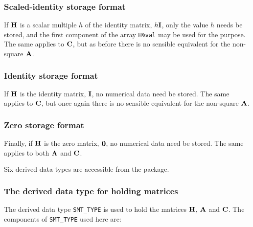 \documentclass{galahad}
\begin{document}
\subsubsection{Scaled-identity storage format}\label{scaled}
If ${\mathbf{H}}$ is a scalar multiple $h$ of the identity matrix, $h {\mathbf{I}}$,
only the value $h$ needs be stored,
and the first component of the array {\tt H\%val}
 may be used for
the purpose. The same applies to ${\mathbf{C}}$, but
as before there is no sensible equivalent for the non-square ${\mathbf{A}}$.

\subsubsection{Identity storage format}\label{identity}
If ${\mathbf{H}}$ is the identity matrix, ${\mathbf{I}}$,
no numerical data need be stored. The same applies to ${\mathbf{C}}$, but
once again there is no sensible equivalent for the non-square ${\mathbf{A}}$.

\subsubsection{Zero storage format}\label{zero}
Finally, if ${\mathbf{H}}$ is the zero matrix, ${\mathbf{0}}$,
no numerical data need be stored. The same applies to both ${\mathbf{A}}$ and ${\mathbf{C}}$.








\galtypes
Six derived data types are accessible from the package.


\subsubsection{The derived data type for holding matrices}\label{typesmt}
The derived data type {\tt SMT\_TYPE} is used to hold the matrices ${\mathbf{H}}$,
${\mathbf{A}}$ and ${\mathbf{C}}$. The components of {\tt SMT\_TYPE} used here are:
\end{document}

